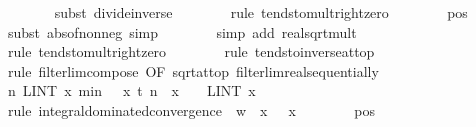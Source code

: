 \documentclass{svjour3}
\begin{document}
{\begin{isabellebody}
\ \ \ \ \ \ \isamarkupfalse%
\ {\isacharparenleft}subst\ divide{\isacharunderscore}inverse{\isacharparenright}\isanewline
\ \ \ \ \ \ \isamarkupfalse%
\ {\isacharparenleft}rule\ tendsto{\isacharunderscore}mult{\isacharunderscore}right{\isacharunderscore}zero{\isacharparenright}\isanewline
\ \ \ \ \ \ \isamarkupfalse%
\ {\isasymsigma}{\isacharunderscore}pos\ \isamarkupfalse%
\ {\isacharparenleft}subst\ abs{\isacharunderscore}of{\isacharunderscore}nonneg{\isacharcomma}\ simp{\isacharparenright}\isanewline
\ \ \ \ \ \ \isamarkupfalse%
\ {\isacharparenleft}simp\ add{\isacharcolon}\ real{\isacharunderscore}sqrt{\isacharunderscore}mult{\isacharparenright}\isanewline
\ \ \ \ \ \ \isamarkupfalse%
\ {\isacharparenleft}rule\ tendsto{\isacharunderscore}mult{\isacharunderscore}right{\isacharunderscore}zero{\isacharparenright}\isanewline
\ \ \ \ \ \ \isamarkupfalse%
\ {\isacharparenleft}rule\ tendsto{\isacharunderscore}inverse{\isacharunderscore}{}{\isacharunderscore}at{\isacharunderscore}top{\isacharparenright}\isanewline
\ \ \ \ \ \ \isamarkupfalse%
\ {\isacharparenleft}rule\ filterlim{\isacharunderscore}compose\ {\isacharbrackleft}OF\ sqrt{\isacharunderscore}at{\isacharunderscore}top\ filterlim{\isacharunderscore}real{\isacharunderscore}sequentially{\isacharbrackright}{\isacharparenright}\isanewline
\ \ \ \ \isamarkupfalse%
\ {\isachardoublequoteopen}{\isacharparenleft}{\isasymlambda}n{\isachardot}\ LINT\ x{\isacharbar}{\isasymmu}{\isachardot}\ min\ {\isacharparenleft}{}\ {\isacharasterisk}\ x\ {\isacharparenleft}{\isasymbar}{\isacharquery}t\ n{\isasymbar}\ {\isacharasterisk}\ {\isasymbar}x{\isasymbar}\ {\isacharcircum}\ {}{\isacharparenright}{\isacharparenright}\ {\isacharminus}{\isacharminus}{\isacharminus}{\isacharminus}{\isachargreater}\ {\isacharparenleft}LINT\ x{\isacharbar}{\isasymmu}{\isachardot}\ {}{\isacharparenright}{\isachardoublequoteclose}\isanewline
\ \ \ \ \ \ \isamarkupfalse%
\ {\isacharparenleft}rule\ integral{\isacharunderscore}dominated{\isacharunderscore}convergence\ {\isacharbrackleft}\ w\ {\isacharequal}\ {\isachardoublequoteopen}{\isasymlambda}x{\isachardot}\ {}\ {\isacharasterisk}\ x{\isacharcircum}{}{\isachardoublequoteclose}{\isacharbrackright}{\isacharparenright}\isanewline
\ \ \ \ \ \ \isamarkupfalse%
\ {\isasymsigma}{\isacharunderscore}pos\ \isamarkupfalse%

\end{isabellebody}}
\end{document}
